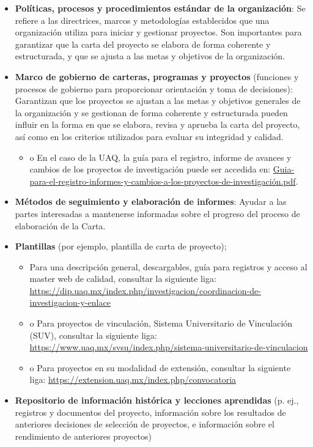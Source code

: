 \documentclass[letterpaper,12pt,openright,oneside]{article}
\theoremstyle{plain}
\begin{document}
\begin{itemize}
    \item \textbf{Políticas, procesos y procedimientos estándar de la organización}: Se refiere a las directrices, marcos y metodologías establecidos que una organización utiliza para iniciar y gestionar proyectos. Son importantes para garantizar que la carta del proyecto se elabora de forma coherente y estructurada, y que se ajusta a las metas y objetivos de la organización.
    \item \textbf{Marco de gobierno de carteras, programas y proyectos} (funciones y procesos de gobierno para proporcionar orientación y toma de decisiones): Garantizan que los proyectos se ajustan a las metas y objetivos generales de la organización y se gestionan de forma coherente y estructurada pueden influir en la forma en que se elabora, revisa y aprueba la carta del proyecto, así como en los criterios utilizados para evaluar su integridad y calidad.
        \begin{itemize}
            \item o	En el caso de la UAQ, la guía para el registro, informe de avances y cambios de los proyectos de investigación puede ser accedida en: \href{run:https://dip.uaq.mx/docs/investigacion/formatos/A-50-01-Guia-para-el-registro-informes-y-cambios-a-los-proyectos-de-investigacion_v1.2.pdf}{Guia-para-el-registro-informes-y-cambios-a-los-proyectos-de-investigación.pdf}.
        \end{itemize}
    \item \textbf{Métodos de seguimiento y elaboración de informes}: Ayudar a las partes interesadas a mantenerse informadas sobre el progreso del proceso de elaboración de la Carta.
    \item \textbf{Plantillas} (por ejemplo, plantilla de carta de proyecto);
        \begin{itemize}
            \item Para una descripción general, descargables, guía para registros y acceso al master web de calidad, consultar la siguiente liga: \url{https://dip.uaq.mx/index.php/investigacion/coordinacion-de-investigacion-y-enlace}
            \item o	Para proyectos de vinculación, Sistema Universitario de Vinculación (SUV), consultar la siguiente liga: \url{https://www.uaq.mx/svsu/index.php/sistema-universitario-de-vinculacion}
            \item o	Para proyectos en su modalidad de extensión, consultar la siguiente liga: \url{https://extension.uaq.mx/index.php/convocatoria} 
        \end{itemize}
    \item \textbf{Repositorio de información histórica y lecciones aprendidas} (p. ej., registros y documentos del proyecto, información sobre los resultados de anteriores decisiones de selección de proyectos, e información sobre el rendimiento de anteriores proyectos)
\end{itemize}
\end{document}
